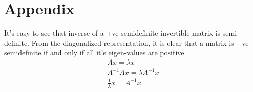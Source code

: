 \documentclass[11pt,a4paper,oneside]{report}
\begin{document}
\section*{Appendix}
It's easy to see that inverse of a +ve semidefinite invertible matrix is semi-definite.
From the diagonalized representation, it is clear that a matrix is +ve semidefinite if and only if all it's eigen-values are positive.
\begin{eqnarray*}
Ax=\lambda x\\
A^{-1}Ax=\lambda A^{-1}x\\
\frac{1}{\lambda}x=A^{-1}x
\end{eqnarray*}



\end{document}
